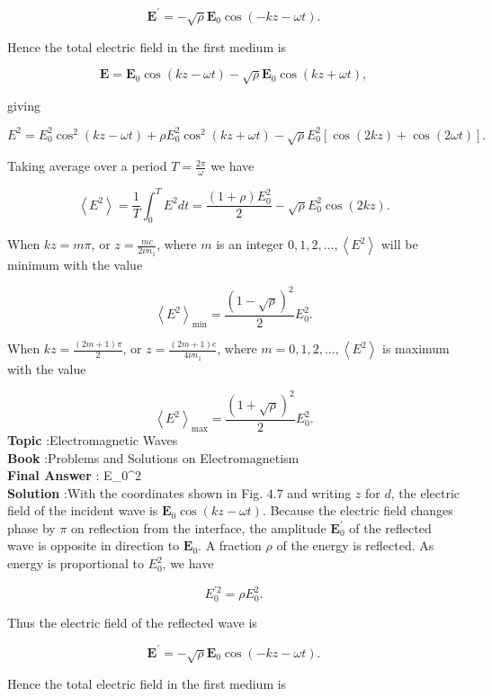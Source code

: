 \documentclass[10pt]{article}
\begin{document}
$$
\mathbf{E}^{\prime}=-\sqrt{\rho} \mathbf{E}_{0} \cos (-k z-\omega t) .
$$

Hence the total electric field in the first medium is

$$
\mathbf{E}=\mathbf{E}_{0} \cos (k z-\omega t)-\sqrt{\rho} \mathbf{E}_{0} \cos (k z+\omega t),
$$

giving

$$
E^{2}=E_{0}^{2} \cos ^{2}(k z-\omega t)+\rho E_{0}^{2} \cos ^{2}(k z+\omega t)-\sqrt{\rho} E_{0}^{2}[\cos (2 k z)+\cos (2 \omega t)] \text {. }
$$

Taking average over a period $T=\frac{2 \pi}{\omega}$ we have

$$
\left\langle E^{2}\right\rangle=\frac{1}{T} \int_{0}^{T} E^{2} d t=\frac{(1+\rho) E_{0}^{2}}{2}-\sqrt{\rho} E_{0}^{2} \cos (2 k z) .
$$

When $k z=m \pi$, or $z=\frac{m c}{2 \nu n_{1}}$, where $m$ is an integer $0,1,2, \ldots,\left\langle E^{2}\right\rangle$ will be minimum with the value

$$
\left\langle E^{2}\right\rangle_{\min }=\frac{(1-\sqrt{\rho})^{2}}{2} E_{0}^{2} .
$$

When $k z=\frac{(2 m+1) \pi}{2}$, or $z=\frac{(2 m+1) c}{4 \nu n_{1}}$, where $m=0,1,2, \ldots,\left\langle E^{2}\right\rangle$ is maximum with the value

$$
\left\langle E^{2}\right\rangle_{\max }=\frac{(1+\sqrt{\rho})^{2}}{2} E_{0}^{2} .
$$
\textbf{Topic} :Electromagnetic Waves\\
\textbf{Book} :Problems and Solutions on Electromagnetism\\
\textbf{Final Answer} : E_{0}^{2}\\


\textbf{Solution} :With the coordinates shown in Fig. $4.7$ and writing $z$ for $d$, the electric field of the incident wave is $\mathbf{E}_{0} \cos (k z-\omega t)$. Because the electric field changes phase by $\pi$ on reflection from the interface, the amplitude $\mathbf{E}_{0}^{\prime}$ of the reflected wave is opposite in direction to $\mathbf{E}_{0}$. A fraction $\rho$ of the energy is reflected. As energy is proportional to $E_{0}^{2}$, we have

$$
E_{0}^{\prime 2}=\rho E_{0}^{2} .
$$

Thus the electric field of the reflected wave is

$$
\mathbf{E}^{\prime}=-\sqrt{\rho} \mathbf{E}_{0} \cos (-k z-\omega t) .
$$

Hence the total electric field in the first medium is
\end{document}
